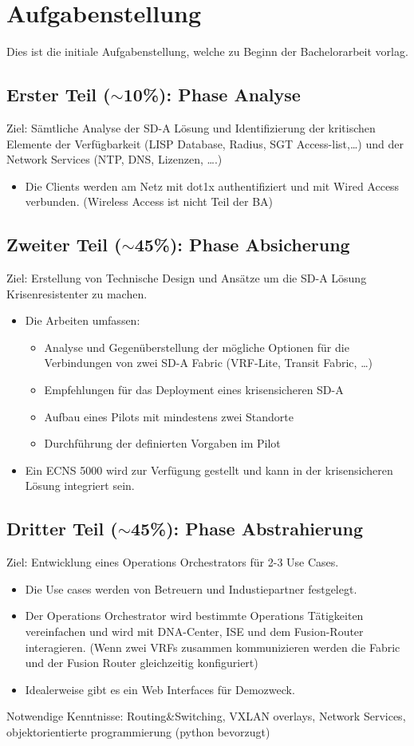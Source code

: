 \section{Aufgabenstellung}
Dies ist die initiale Aufgabenstellung, welche zu Beginn der Bachelorarbeit vorlag. 

\subsection{Erster Teil ($\sim$10\%): Phase Analyse}
Ziel: Sämtliche Analyse der SD-A Lösung und Identifizierung der kritischen Elemente der Verfügbarkeit (LISP Database, Radius, SGT Access-list,…) und der Network Services (NTP, DNS, Lizenzen, ….)
\begin{itemize}
	\item Die Clients werden am Netz mit dot1x authentifiziert und mit Wired Access verbunden. (Wireless Access ist nicht Teil der BA)
\end{itemize}


\subsection{Zweiter Teil ($\sim$45\%): Phase Absicherung}
Ziel: Erstellung von Technische Design und Ansätze um die SD-A Lösung Krisenresistenter zu machen.
\begin{itemize}
	\item Die Arbeiten umfassen:
	\begin{itemize}
		\item Analyse und Gegenüberstellung der mögliche Optionen für die Verbindungen von zwei SD-A Fabric (VRF-Lite, Transit Fabric, …)
		\item Empfehlungen für das Deployment eines krisensicheren SD-A
		\item Aufbau eines Pilots mit mindestens zwei Standorte
		\item Durchführung der definierten Vorgaben im Pilot
	\end{itemize}
	\item Ein ECNS 5000 wird zur Verfügung gestellt und kann in der krisensicheren Lösung integriert sein.
\end{itemize}


\subsection{Dritter Teil ($\sim$45\%): Phase Abstrahierung}
Ziel: Entwicklung eines Operations Orchestrators für 2-3 Use Cases. 
\begin{itemize}
	\item Die Use cases werden von Betreuern und Industiepartner festgelegt.
	\item Der Operations Orchestrator wird bestimmte Operations Tätigkeiten vereinfachen und wird mit DNA-Center, ISE und dem Fusion-Router interagieren. (Wenn zwei VRFs zusammen kommunizieren werden die Fabric und der Fusion Router gleichzeitig konfiguriert)
	\item Idealerweise gibt es ein Web Interfaces für Demozweck.
\end{itemize}

Notwendige Kenntnisse: Routing\&Switching, VXLAN overlays, Network Services, objektorientierte programmierung (python bevorzugt)


